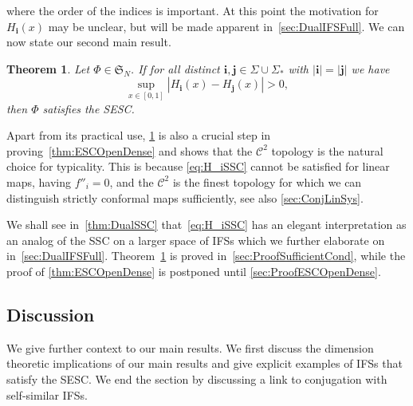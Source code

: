 \documentclass[11pt,a4paper]{article}
\def\cref#1{\ref{#1}}%
\newtheorem{theorem}{Theorem}[section]
\theoremstyle{definition}
\theoremstyle{remark}
\newcommand{\0}{\mathbf{0}}
\newcommand{\bi}{\mathbf{i}}
\newcommand{\bj}{\mathbf{j}}
\numberwithin{equation}{section}
\begin{document}
where the order of the indices is important. At this point the motivation for $H_{\bi}(x)$ may be unclear,
but will be made apparent in~\cref{sec:DualIFSFull}. 
We can now state our second main result.
\begin{theorem}
  \label{thm:main}
  Let $\Phi\in\mathfrak{S}_N$. If for all distinct $\bi,\bj \in\Sigma\cup\Sigma_*$ with $|\bi|=|\bj|$ we have
\begin{equation}\label{eq:H_iSSC}
    \sup_{x\in[0,1]} |H_{\bi}(x) - H_{\bj}(x)| > 0,
\end{equation}
then $\Phi$ satisfies the SESC.
\end{theorem}
Apart from its practical use, \cref{thm:main} is also a crucial step in
proving~\cref{thm:ESCOpenDense} and shows that the $\mathcal{C}^2$ topology
is the natural choice for typicality.
This is because \cref{eq:H_iSSC} cannot be satisfied for linear maps, having $f''_i =0$, and the
$\mathcal{C}^2$ is the finest topology for which we can distinguish strictly conformal maps
sufficiently, see also \cref{sec:ConjLinSys}.

We shall see in~\cref{thm:DualSSC} that~\cref{eq:H_iSSC} has an elegant interpretation as an analog
of the SSC on a larger space of IFSs which we further elaborate on in~\cref{sec:DualIFSFull}. 
Theorem~\ref{thm:main} is proved in~\cref{sec:ProofSufficientCond}, while the proof of
\cref{thm:ESCOpenDense} is postponed until \cref{sec:ProofESCOpenDense}.

\subsection{Discussion}
We give further context to our main results. We first discuss the dimension theoretic implications
of our main results and  give explicit examples of IFSs that satisfy the SESC. We end the section by
discussing a link to conjugation with self-similar IFSs.
\end{document}
